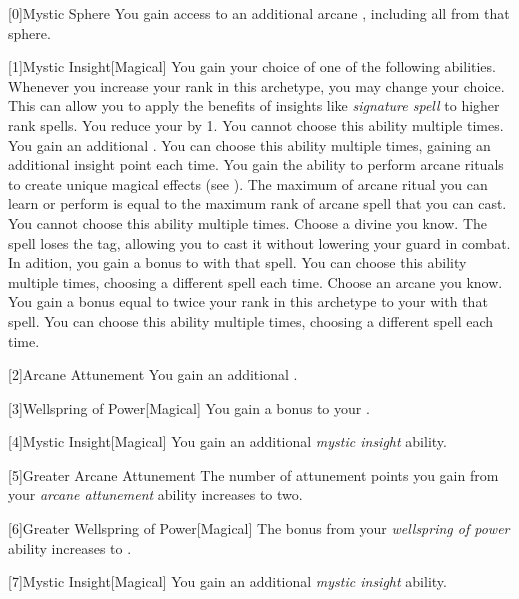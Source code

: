        [0]{Mystic Sphere} You gain access to an additional arcane , including all  from that sphere.

        [1]{Mystic Insight}[Magical]
        You gain your choice of one of the following abilities.
        Whenever you increase your rank in this archetype, you may change your choice.
        This can allow you to apply the benefits of insights like \textit{signature spell} to higher rank spells.
        {
             You reduce your  by 1.
                You cannot choose this ability multiple times.
             You gain an additional .
                You can choose this ability multiple times, gaining an additional insight point each time.
             You gain the ability to perform arcane rituals to create unique magical effects (see ).
                The maximum  of arcane ritual you can learn or perform is equal to the maximum rank of arcane spell that you can cast.
                You cannot choose this ability multiple times.
             Choose a divine  you know.
                The spell loses the  tag, allowing you to cast it without lowering your guard in combat.
                In adition, you gain a  bonus to  with that spell.
                You can choose this ability multiple times, choosing a different spell each time.
             Choose an arcane  you know.
                You gain a bonus equal to twice your rank in this archetype to your  with that spell.
                You can choose this ability multiple times, choosing a different spell each time.
        }

        [2]{Arcane Attunement} You gain an additional .

        [3]{Wellspring of Power}[Magical]
        You gain a  bonus to your  .

        [4]{Mystic Insight}[Magical]
        You gain an additional \textit{mystic insight} ability.

        [5]{Greater Arcane Attunement} The number of attunement points you gain from your \textit{arcane attunement} ability increases to two.

        [6]{Greater Wellspring of Power}[Magical]
        The bonus from your \textit{wellspring of power} ability increases to .

        [7]{Mystic Insight}[Magical]
        You gain an additional \textit{mystic insight} ability.
